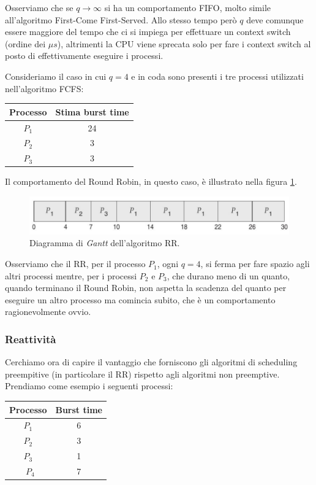 Osserviamo che se $q \to\infty$ si ha un comportamento FIFO, molto simile all'algoritmo First-Come First-Served. Allo stesso tempo però $q$ deve comunque essere maggiore del tempo che ci si impiega per effettuare un context switch (ordine dei $\mu s$), altrimenti la CPU viene sprecata solo per fare i context switch al posto di effettivamente eseguire i processi. 

Consideriamo il caso in cui $q = 4$ e in coda sono presenti i tre processi utilizzati nell'algoritmo FCFS:
\begin{table}[h]
    \centering
    \begin{tabular}{c c}
        \textbf{Processo} & \textbf{Stima burst time} \\\hline
        $P_1$ & 24 \\
        $P_2$ & 3 \\
        $P_3$ & 3 \\\hline
    \end{tabular}
\end{table}

\noindent Il comportamento del Round Robin, in questo caso, è illustrato nella figura \ref{fig:RR}.
\begin{figure}[h]
    \centering
    \includegraphics[width = .75\textwidth]{../res/imgs/CPU scheduling/RR.png}
    \caption{Diagramma di \textit{Gantt} dell'algoritmo RR.}
    \label{fig:RR}
\end{figure}
Osserviamo che il RR, per il processo $P_1$, ogni $q = 4$, si ferma per fare spazio agli altri processi mentre, per i processi $P_2$ e $P_3$, che durano meno di un quanto, quando terminano il Round Robin, non aspetta la scadenza del quanto per eseguire un altro processo ma comincia subito, che è un comportamento ragionevolmente ovvio. 
% 
\subsubsection{Reattività}
Cerchiamo ora di capire il vantaggio che forniscono gli algoritmi di scheduling preempitive (in particolare il RR) rispetto agli algoritmi non preemptive. Prendiamo come esempio i seguenti processi:
\begin{table}[h]
    \centering
    \begin{tabular}{c c}
        \textbf{Processo} & \textbf{Burst time} \\\hline
        $P_1$ & 6 \\
        $P_2$ & 3 \\
        $P_3$ & 1 \\\
        $P_4$ & 7 \\\hline
    \end{tabular}
\end{table}

